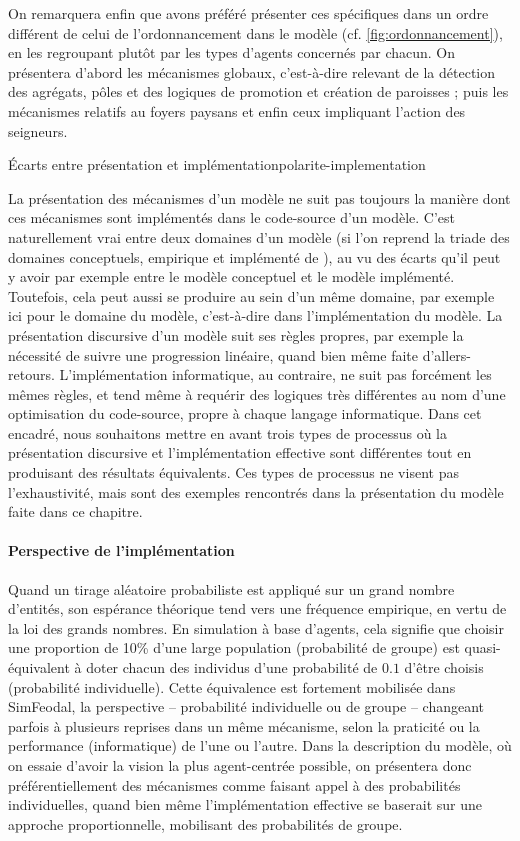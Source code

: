 On remarquera enfin que avons préféré présenter ces spécifiques dans un ordre différent de celui de l'ordonnancement dans le modèle (cf. \cref{fig:ordonnancement}), en les regroupant plutôt par les types d'agents concernés par chacun. On présentera d'abord les mécanismes \og globaux\fg{}, c'est-à-dire relevant de la détection des agrégats, pôles et des logiques de promotion et création de paroisses ; puis les mécanismes relatifs au foyers paysans et enfin ceux impliquant l'action des seigneurs.

\bigskip 
\begin{encadre}{Écarts entre présentation et implémentation}{polarite-implementation}
	
La présentation des mécanismes d'un modèle ne suit pas toujours la manière dont ces mécanismes sont implémentés dans le code-source d'un modèle.
C'est naturellement vrai entre deux \og domaines\fg{} d'un modèle (si l'on reprend la triade des domaines conceptuels, empirique et implémenté de \textcite{livet2014diversite}), au vu des écarts qu'il peut y avoir par exemple entre le modèle conceptuel et le modèle implémenté.
Toutefois, cela peut aussi se produire au sein d'un même domaine, par exemple ici pour le \og domaine du modèle\fg{}, c'est-à-dire dans l'implémentation du modèle.
La présentation discursive d'un modèle suit ses règles propres, par exemple la nécessité de suivre une progression linéaire, quand bien même faite d'allers-retours.
L'implémentation informatique, au contraire, ne suit pas forcément les mêmes règles, et tend même à requérir des logiques très différentes au nom d'une \og optimisation\fg{} du code-source, propre à chaque langage informatique.
Dans cet encadré, nous souhaitons mettre en avant trois types de processus où la présentation discursive et l'implémentation effective sont différentes tout en produisant des résultats équivalents.
Ces types de processus ne visent pas l'exhaustivité, mais sont des exemples rencontrés dans la présentation du modèle faite dans ce chapitre.

\paragraph{Perspective de l'implémentation} Quand un tirage aléatoire probabiliste est appliqué sur un grand nombre d'entités, son espérance théorique tend vers une fréquence empirique, en vertu de la loi des grands nombres.
En simulation à base d'agents, cela signifie que choisir une proportion de 10\% d'une large population (\og probabilité de groupe\fg{}) est quasi-équivalent à doter chacun des individus d'une probabilité de $0.1$ d'être choisis (\og probabilité individuelle\fg{}).
Cette équivalence est fortement mobilisée dans SimFeodal, la perspective\fg{} -- probabilité individuelle ou de groupe -- changeant parfois à plusieurs reprises dans un même mécanisme, selon la praticité ou la performance (informatique) de l'une ou l'autre.
Dans la description du modèle, où on essaie d'avoir la vision la plus \og agent-centrée\fg{} possible, on présentera donc préférentiellement des mécanismes comme faisant appel à des probabilités individuelles, quand bien même l'implémentation effective se baserait sur une approche proportionnelle, mobilisant des probabilités de groupe.


\end{encadre}
